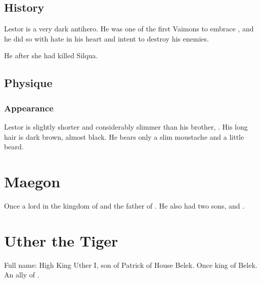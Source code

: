 \subsection{History}
Lestor is a very dark antihero. 
He was one of the first Vaimons to embrace \Itzach, and he did so with hate in his heart and intent to destroy his enemies. 

He  after she had killed Silqua. 









\subsection{Physique}
\subsubsection{Appearance}
Lestor is slightly shorter and considerably slimmer than his brother, . 
His long hair is dark brown, almost black. 
He bears only a slim moustache and a little beard. 















\section{Maegon \Delaen}
Once a lord in the kingdom of \Imrath{} and the father of . 
He also had two sons,  and . 















\section{Uther the Tiger}
Full name: High King Uther I, son of Patrick of House Belek. 
Once king of Belek. 
An ally of . 


